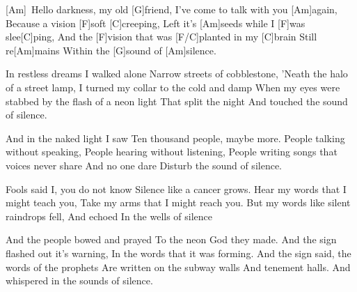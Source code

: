 [Am]\  Hello darkness, my old [G]friend,
I've come to talk with you [Am]again,
Because a vision [F]soft [C]creeping,
Left it's [Am]seeds while I [F]was slee[C]ping,
And the [F]vision that was [F/C]planted in my [C]brain
Still re[Am]mains
Within the [G]sound of [Am]silence.

In restless dreams I walked alone
Narrow streets of cobblestone,
'Neath the halo of a street lamp,
I turned my collar to the cold and damp
When my eyes were stabbed by the flash of a neon light
That split the night
And touched the sound of silence.

And in the naked light I saw
Ten thousand people, maybe more.
People talking without speaking,
People hearing without listening,
People writing songs that voices never share
And no one dare
Disturb the sound of silence.

Fools said I, you do not know
Silence like a cancer grows.
Hear my words that I might teach you,
Take my arms that I might reach you.
But my words like silent raindrops fell,
And echoed
In the wells of silence

And the people bowed and prayed
To the neon God they made.
And the sign flashed out it's warning,
In the words that it was forming.
And the sign said, the words of the prophets
Are written on the subway walls
And tenement halls.
And whispered in the sounds of silence.


